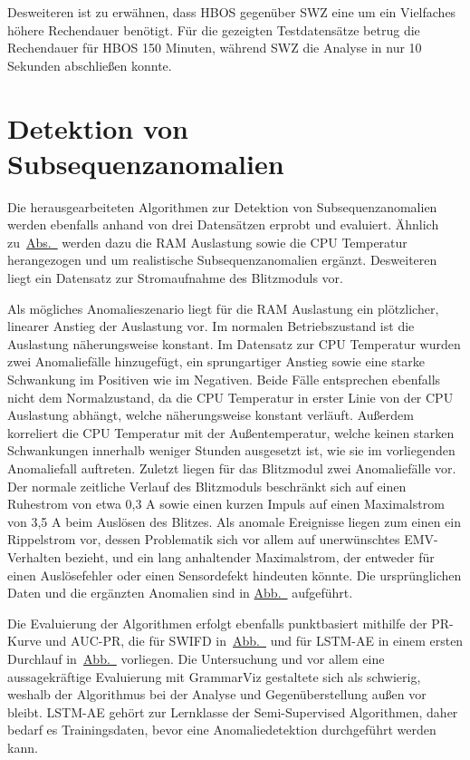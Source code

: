 Desweiteren ist zu erwähnen, dass HBOS gegenüber SWZ eine um ein Vielfaches höhere Rechendauer benötigt. Für die gezeigten Testdatensätze
betrug die Rechendauer für HBOS 150 Minuten, während SWZ die Analyse in nur 10 Sekunden abschließen konnte.

\section{Detektion von Subsequenzanomalien}
Die herausgearbeiteten Algorithmen zur Detektion von Subsequenzanomalien werden ebenfalls anhand von drei Datensätzen erprobt und evaluiert.
Ähnlich zu~\hyperref[sec:punktanomaliedetektion]{Abs.~} werden dazu die RAM Auslastung sowie die CPU Temperatur
herangezogen und um realistische Subsequenzanomalien ergänzt. Desweiteren liegt ein Datensatz zur Stromaufnahme des Blitzmoduls vor.

Als mögliches Anomalieszenario liegt für die RAM Auslastung ein plötzlicher, linearer Anstieg der Auslastung vor. Im normalen Betriebszustand
ist die Auslastung näherungsweise konstant. Im Datensatz zur CPU Temperatur wurden zwei Anomaliefälle hinzugefügt, ein sprungartiger Anstieg
sowie eine starke Schwankung im Positiven wie im Negativen. Beide Fälle entsprechen ebenfalls nicht dem Normalzustand, da die CPU Temperatur
in erster Linie von der CPU Auslastung abhängt, welche näherungsweise konstant verläuft. Außerdem korreliert die CPU Temperatur
mit der Außentemperatur, welche keinen starken Schwankungen innerhalb weniger Stunden ausgesetzt ist, wie sie im vorliegenden Anomaliefall
auftreten. Zuletzt liegen für das Blitzmodul zwei Anomaliefälle vor. Der normale zeitliche Verlauf des Blitzmoduls beschränkt sich auf einen
Ruhestrom von etwa 0,3 A sowie einen kurzen Impuls auf einen Maximalstrom von 3,5 A beim Auslösen des Blitzes. Als anomale Ereignisse liegen
zum einen ein Rippelstrom vor, dessen Problematik sich vor allem auf unerwünschtes EMV-Verhalten bezieht, und ein lang anhaltender Maximalstrom,
der entweder für einen Auslösefehler oder einen Sensordefekt hindeuten könnte. Die ursprünglichen Daten und die ergänzten Anomalien sind in
\hyperref[fig:subsequenz_datensätze]{Abb.~} aufgeführt.

Die Evaluierung der Algorithmen erfolgt ebenfalls punktbasiert mithilfe der PR-Kurve und AUC-PR, die für SWIFD
in~\hyperref[fig:SWIFD_AUC_PR]{Abb.~} und für LSTM-AE in einem ersten Durchlauf
in~\hyperref[fig:LSTMAE_AUC_PR_1]{Abb.~} vorliegen. Die Untersuchung und vor allem eine aussagekräftige Evaluierung
mit GrammarViz gestaltete sich als schwierig, weshalb der Algorithmus bei der Analyse und Gegenüberstellung außen vor bleibt. LSTM-AE gehört
zur Lernklasse der Semi-Supervised Algorithmen, daher bedarf es Trainingsdaten, bevor eine Anomaliedetektion durchgeführt werden kann.

